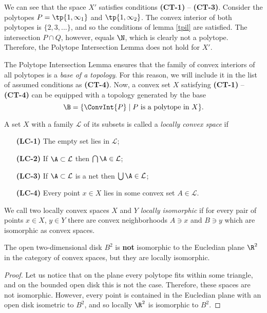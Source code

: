 \documentclass[12pt, a4paper]{article}
\newcommand{\Le}{\mathcal{L}}
\begin{document}
We can see that the space \(X'\) satisfies conditions \textbf{(CT-1)} -- \textbf{(CT-3)}. Consider the polytopes \(P = \tp{1, \infty_1}\) and \(\tp{1, \infty_2}\). The convex interior of both polytopes is \(\{2, 3, ...\}\), and so the conditions of lemma \ref{tpil} are satisfied. The intersection \(P \cap Q\), however, equals \(\N\), which is clearly not a polytope. Therefore, the Polytope Intersection Lemma does not hold for \(X'\).

\begin{definition}\label{def-conv-top}
    The Polytope Intersection Lemma ensures that the family of convex interiors of all polytopes is a \textit{base of a topology}. For this reason, we will include it in the list of assumed conditions as \textbf{(CT-4)}. Now, a convex set \(X\) satisfying \textbf{(CT-1)} -- \textbf{(CT-4)} can be equipped with a topology generated by the base \[\B = \{\ConvInt{P} \mid P \mbox{ is a polytope in } X\}.\]
\end{definition}



\begin{definition}
    A set \(X\) with a family \(\Le\) of its subsets is called a \textit{locally convex space} if

    \begin{itemize}
        \item[\textbf{(LC-1)}] The empty set lies in \(\Le\);
        \item[\textbf{(LC-2)}] If \(\A \subset \Le\) then \(\bigcap \A \in \Le\);
        \item[\textbf{(LC-3)}] If \(\A \subset \Le\) is a net then \(\bigcup \A \in \Le\);
        \item[\textbf{(LC-4)}] Every point \(x \in X\) lies in some convex set \(A \in \Le\). 
    \end{itemize}
\end{definition}

\begin{definition}
    We call two locally convex spaces \(X\) and \(Y\) \textit{locally isomorphic} if for every pair of points \(x \in X\), \(y \in Y\) there are convex neighborhoods \(A \ni x\) and \(B \ni y\) which are isomorphic as convex spaces.
\end{definition}

\begin{statement}
The open two-dimensional disk \(B^2\) is \textbf{not} isomorphic to the Eucledian plane \(\R^2\) in the category of convex spaces, but they are locally isomorphic.
\end{statement}
\begin{proof}
    Let us notice that on the plane every polytope fits within some triangle, and on the bounded open disk this is not the case. Therefore, these spaces are not isomorphic. However, every point is contained in the Eucledian plane with an open disk isometric to \(B^2\), and so locally \(\R^2\) is isomorphic to \(B^2\).
\end{proof}
\end{document}
